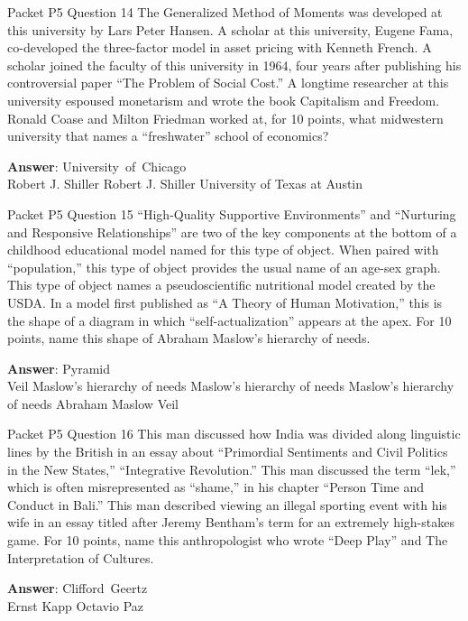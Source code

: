 \begin{frame}{Packet P5 Question 14}
The Generalized Method of Moments was developed at this university by Lars Peter Hansen. A scholar at this university, Eugene Fama, co-developed the three-factor model in asset pricing   with Kenneth French. A scholar joined the faculty of this university in 1964, four years after publishing his controversial   paper “The Problem of Social Cost.” A longtime researcher at this university espoused monetarism and wrote the book Capitalism and Freedom. Ronald Coase   and Milton Friedman worked at, for 10 points, what midwestern university that names a ``freshwater'' school of economics?    

\textbf{Answer}: University\ of\ Chicago\\
 Robert J. Shiller
 Robert J. Shiller
 University of Texas at Austin
\end{frame}

\begin{frame}{Packet P5 Question 15}
“High-Quality Supportive Environments” and “Nurturing and Responsive Relationships” are two of the key components at the bottom of a childhood educational model named for this type of object. When paired with ``population,''   this type of object provides the usual name of an age-sex graph. This type of object names a pseudoscientific nutritional model created by the USDA. In a model first published as “A Theory of Human Motivation,” this is the shape of a diagram in which “self-actualization” appears at the apex. For 10 points, name this shape of Abraham Maslow’s   hierarchy of needs.        

\textbf{Answer}: Pyramid\\
 Veil
 Maslow's hierarchy of needs
 Maslow's hierarchy of needs
 Maslow's hierarchy of needs
 Abraham Maslow
 Veil
\end{frame}

\begin{frame}{Packet P5 Question 16}
This man discussed how India was divided along   linguistic lines by the British in an essay about ``Primordial   Sentiments and Civil Politics in the New States,'' “Integrative Revolution.” This man discussed the term ``lek,'' which is often misrepresented as ``shame,'' in his chapter ``Person Time and Conduct in Bali.'' This man described viewing an illegal sporting event with his wife in   an essay titled after Jeremy Bentham's term for an extremely high-stakes game. For 10 points, name this anthropologist who     wrote ``Deep Play''   and The Interpretation of Cultures.

\textbf{Answer}: Clifford\ Geertz\\
 Ernst Kapp
 Octavio Paz
\end{frame}

